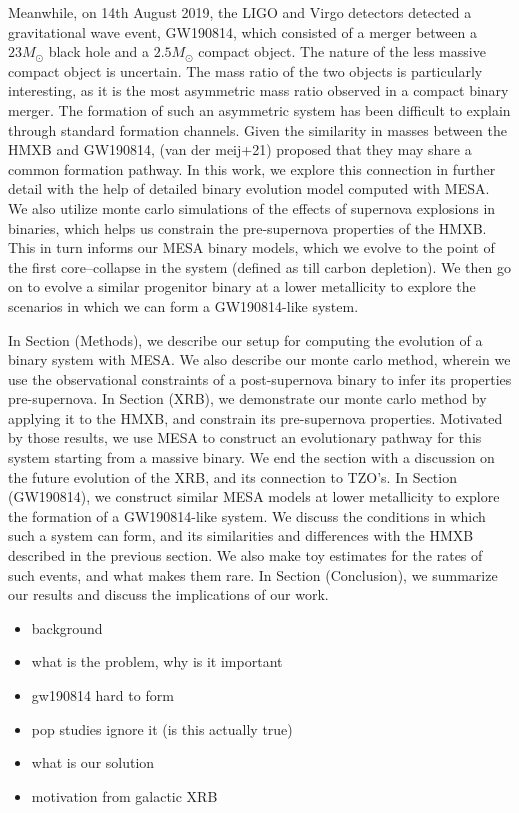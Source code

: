 \documentclass[linenumbers,trackchanges,twocolumn]{aastex701}
\begin{document}
Meanwhile, on 14th August 2019, the LIGO and Virgo detectors detected a gravitational wave event, GW190814, which consisted of a merger between a $23M_{\odot}$ black hole and a $2.5M_{\odot}$ compact object. The nature of the less massive compact object is uncertain. The mass ratio of the two objects is particularly interesting, as it is the most asymmetric mass ratio observed in a compact binary merger. The formation of such an asymmetric system has been difficult to explain through standard formation channels. Given the similarity in masses between the HMXB and GW190814, (van der meij+21) proposed that they may share a common formation pathway. In this work, we explore this connection in further detail with the help of detailed binary evolution model computed with MESA. We also utilize monte carlo simulations of the effects of supernova explosions in binaries, which helps us constrain the pre-supernova properties of the HMXB. This in turn informs our MESA binary models, which we evolve to the point of the first core--collapse in the system (defined as till carbon depletion). We then go on to evolve a similar progenitor binary at a lower metallicity to explore the scenarios in which we can form a GW190814-like system.

In Section (Methods), we describe our setup for computing the evolution of a binary system with MESA. We also describe our monte carlo method, wherein we use the observational constraints of a post-supernova binary to infer its properties pre-supernova. In Section (XRB), we demonstrate our monte carlo method by applying it to the HMXB, and constrain its pre-supernova properties. Motivated by those results, we use MESA to construct an evolutionary pathway for this system starting from a massive binary. We end the section with a discussion on the future evolution of the XRB, and its connection to TZO's. In Section (GW190814), we construct similar MESA models at lower metallicity to explore the formation of a GW190814-like system. We discuss the conditions in which such a system can form, and its similarities and differences with the HMXB described in the previous section. We also make toy estimates for the rates of such events, and what makes them rare. In Section (Conclusion), we summarize our results and discuss the implications of our work.



\begin{itemize}
    \item background
    \item what is the problem, why is it important
    \item gw190814 hard to form
    \item pop studies ignore it (is this actually true)
    \item what is our solution
    \item motivation from galactic XRB
\end{itemize}
\end{document}
